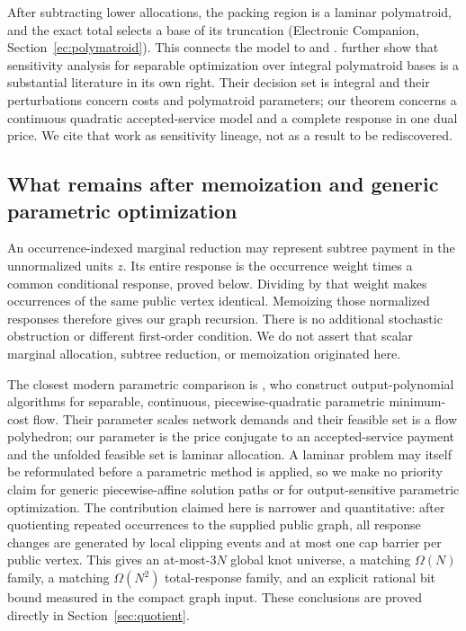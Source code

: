 After subtracting lower allocations, the packing region is a laminar polymatroid, and the exact total selects a base of its truncation (Electronic Companion, Section~\ref{ec:polymatroid}). This connects the model to \citet{FedergruenGroenevelt1986} and \citet{Groenevelt1991}. \citet{HarksKlimmPeis2018} further show that sensitivity analysis for separable optimization over integral polymatroid bases is a substantial literature in its own right. Their decision set is integral and their perturbations concern costs and polymatroid parameters; our theorem concerns a continuous quadratic accepted-service model and a complete response in one dual price. We cite that work as sensitivity lineage, not as a result to be rediscovered.

\subsection{What remains after memoization and generic parametric optimization}
An occurrence-indexed marginal reduction may represent subtree payment in the unnormalized units $z$. Its entire response is the occurrence weight times a common conditional response, proved below. Dividing by that weight makes occurrences of the same public vertex identical. Memoizing those normalized responses therefore gives our graph recursion. There is no additional stochastic obstruction or different first-order condition. We do not assert that scalar marginal allocation, subtree reduction, or memoization originated here.

The closest modern parametric comparison is \citet{KlimmWarode2021}, who construct output-polynomial algorithms for separable, continuous, piecewise-quadratic parametric minimum-cost flow. Their parameter scales network demands and their feasible set is a flow polyhedron; our parameter is the price conjugate to an accepted-service payment and the unfolded feasible set is laminar allocation. A laminar problem may itself be reformulated before a parametric method is applied, so we make no priority claim for generic piecewise-affine solution paths or for output-sensitive parametric optimization. The contribution claimed here is narrower and quantitative: after quotienting repeated occurrences to the supplied public graph, all response changes are generated by local clipping events and at most one cap barrier per public vertex. This gives an at-most-$3N$ global knot universe, a matching $\Omega(N)$ family, a matching $\Omega(N^2)$ total-response family, and an explicit rational bit bound measured in the compact graph input. These conclusions are proved directly in Section~\ref{sec:quotient}.

